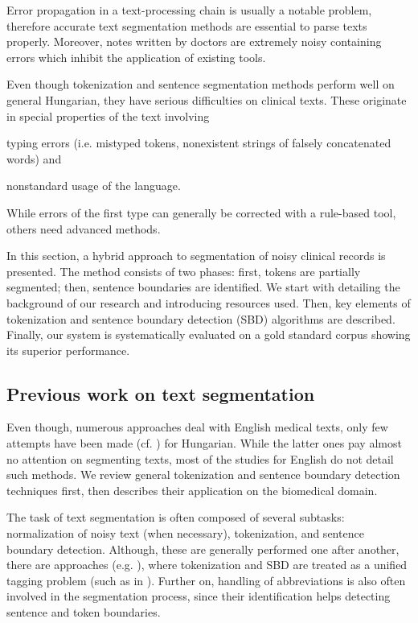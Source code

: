 Error propagation in a text-processing chain is usually a notable problem, therefore accurate text segmentation methods are essential to parse texts properly.
Moreover, notes written by doctors are extremely noisy containing errors which inhibit the application of existing tools.

Even though tokenization and sentence segmentation methods perform well on general Hungarian, they have serious difficulties on clinical texts.
These originate in special properties of the text involving
\begin{inparaenum}
 \item typing errors (i.e. mistyped tokens, nonexistent strings of falsely concatenated words) and
 \item nonstandard usage of the language.
\end{inparaenum}
While errors of the first type can generally be corrected with a rule-based tool, others need advanced methods. 

In this section, a hybrid approach to segmentation of noisy clinical records is presented. 
The method consists of two phases: first, tokens are partially segmented; then, sentence boundaries are identified.
We start with detailing the background of our research and introducing resources used.
Then, key elements of tokenization and sentence boundary detection (SBD) algorithms are described. 
Finally, our system is systematically evaluated on a gold standard corpus showing its superior performance.

\subsection{Previous work on text segmentation}

Even though, numerous approaches deal with English medical texts, only few attempts have been made (cf. \cite{Siklosi2012,Siklosi2013,Siklosi2013b}) for Hungarian. 
While the latter ones pay almost no attention on segmenting texts, most of the studies for English do not detail such methods. 
We review general tokenization and sentence boundary detection techniques first, then describes their application on the biomedical domain.

The task of text segmentation is often composed of several subtasks: normalization of noisy text (when necessary), tokenization, and sentence boundary detection.  
Although, these are generally performed one after another, there are approaches (e.g. \cite{zhu2007unified}), where tokenization and SBD are treated as a unified tagging problem (such as in \cite{mikheev2000tagging}). 
Further on, handling of abbreviations is also often involved in the segmentation process, since their identification helps detecting sentence and token boundaries.

